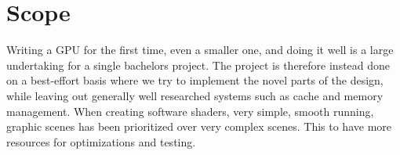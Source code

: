 	\section{Scope}

		Writing a GPU for the first time, even a smaller one, and doing it well
		is a large undertaking for a single bachelors project. The project is
		therefore instead done on a best-effort basis where we try to implement
		the novel parts of the design, while leaving out generally well
		researched systems such as cache and memory management. When creating 
software shaders, very simple, smooth running, graphic scenes has been prioritized 
over very complex scenes. This to have more resources for optimizations and testing.


